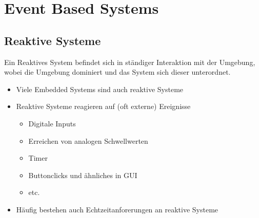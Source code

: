 \section{Event Based Systems}
\subsection{Reaktive Systeme}
Ein Reaktives System befindet sich in ständiger Interaktion mit der Umgebung, wobei die Umgebung dominiert und das System sich dieser unterordnet.
\begin{itemize}
	\item Viele Embedded Systems sind auch reaktive Systeme
	\item Reaktive Systeme reagieren auf (oft externe) Ereignisse
	      \begin{itemize}
		      \item Digitale Inputs
		      \item Erreichen von analogen Schwellwerten
		      \item Timer
		      \item Buttonclicks und ähnliches in GUI
		      \item etc.
	      \end{itemize}
	\item Häufig bestehen auch Echtzeitanforerungen an reaktive Systeme
\end{itemize}

